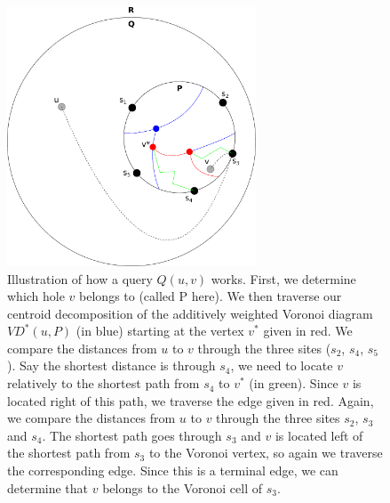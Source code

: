 \begin{figure}[h!]
  \centering
  \includegraphics[width=0.66\textwidth]{figs/vd1.pdf}
  \caption{Illustration of how a query $Q(u,v)$ works. First, we determine which hole $v$
  belongs to (called P here). We then traverse our centroid decomposition of the
  additively weighted Voronoi diagram $VD^*(u,P)$ (in blue) starting at the vertex $v^*$ given in
red. We compare the distances from $u$ to $v$ through the three sites ($s_2$, $s_4$,
$s_5$). Say the shortest distance is through $s_4$, we need to locate $v$ relatively to
the shortest path from $s_4$ to $v^*$ (in green). Since $v$ is
located right of this path, we traverse the edge given in red. Again, we compare the
distances from $u$ to $v$ through the three sites $s_2$, $s_3$ and $s_4$. The shortest
path goes through $s_3$ and $v$ is located left of the shortest path from $s_3$ to the
Voronoi vertex, so again we traverse the corresponding edge. Since this is a terminal
edge, we can determine that $v$ belongs to the Voronoi cell of $s_3$.}
    \label{vd1}
\end{figure}

